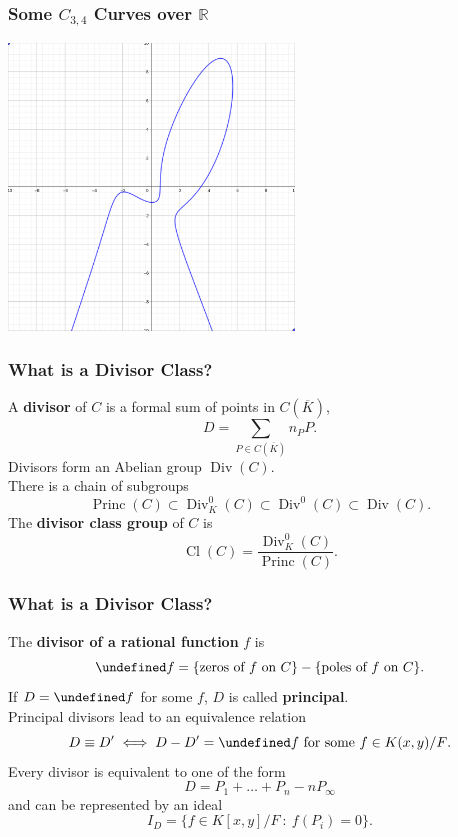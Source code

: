 \documentclass{beamer}
\let\div\undefined
\newcommand{\defn}{\textbf}
\newcommand{\bb}[1]{\mathbb{#1}}
\DeclareMathOperator{\Cl}{Cl}
\DeclareMathOperator{\div}{div}
\DeclareMathOperator{\Div}{Div}
\DeclareMathOperator{\Princ}{Princ}
\renewcommand{\bar}{\overline}
\begin{document}
\begin{frame}
\frametitle{Some $C_{3,4}$ Curves over $\bb R$}
  \begin{center} \includegraphics[height=7.6cm]{curve4.png} \end{center}
\end{frame}


\begin{frame}
\frametitle{What is a Divisor Class?}
  A \defn{divisor} of $C$ is a formal sum of points in $C(\bar K)$,
  \[ D = \sum_{P \in C(\bar K)} n_P P. \]
  Divisors form an Abelian group $\Div(C)$.\\
  \vspace{10pt}
  There is a chain of subgroups
  \[ \Princ(C) \subset \Div_K^0(C) \subset \Div^0(C) \subset \Div(C).\]
  The \defn{divisor class group} of $C$ is
  \[ \Cl(C) = \frac{\Div_K^0(C)}{\Princ(C)}.\]
\end{frame}


\begin{frame}
\frametitle{What is a Divisor Class?}
  The \defn{divisor of a rational function} $f$ is
  \[ \div f = \{ \text{zeros of $f$ on $C$} \} - \{ \text{poles of $f$ on $C$} \}.\]
  If $D = \div f$ for some $f$, $D$ is called \defn{principal}.\\
  Principal divisors lead to an equivalence relation
  \[ D \equiv D' \iff D - D' = \div f \text{ for some $f \in K(x,y)/F$}.\]
  Every divisor is equivalent to one of the form
  \[ D = P_1 + \dots + P_n - nP_\infty \]
  and can be represented by an ideal
  \[ I_D = \{ f \in K[x,y]/F ~:~ f(P_i) = 0 \}. \]
\end{frame}
\end{document}
